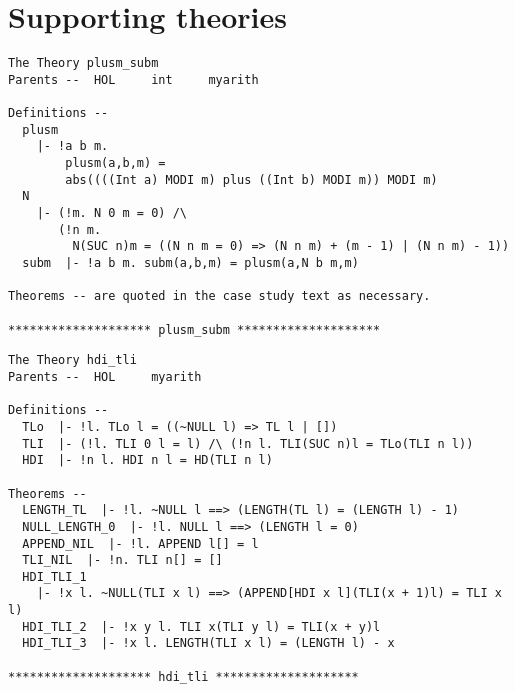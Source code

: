 \appendix
\newpage %

\section{Supporting theories}

\begin{verbatim}
The Theory plusm_subm
Parents --  HOL     int     myarith     

Definitions --
  plusm
    |- !a b m.
        plusm(a,b,m) =
        abs((((Int a) MODI m) plus ((Int b) MODI m)) MODI m)
  N
    |- (!m. N 0 m = 0) /\
       (!n m.
         N(SUC n)m = ((N n m = 0) => (N n m) + (m - 1) | (N n m) - 1))
  subm  |- !a b m. subm(a,b,m) = plusm(a,N b m,m)

Theorems -- are quoted in the case study text as necessary.

******************** plusm_subm ********************
\end{verbatim}

\begin{verbatim}
The Theory hdi_tli
Parents --  HOL     myarith     

Definitions --
  TLo  |- !l. TLo l = ((~NULL l) => TL l | [])
  TLI  |- (!l. TLI 0 l = l) /\ (!n l. TLI(SUC n)l = TLo(TLI n l))
  HDI  |- !n l. HDI n l = HD(TLI n l)
  
Theorems --
  LENGTH_TL  |- !l. ~NULL l ==> (LENGTH(TL l) = (LENGTH l) - 1)
  NULL_LENGTH_0  |- !l. NULL l ==> (LENGTH l = 0)
  APPEND_NIL  |- !l. APPEND l[] = l
  TLI_NIL  |- !n. TLI n[] = []
  HDI_TLI_1
    |- !x l. ~NULL(TLI x l) ==> (APPEND[HDI x l](TLI(x + 1)l) = TLI x l)
  HDI_TLI_2  |- !x y l. TLI x(TLI y l) = TLI(x + y)l
  HDI_TLI_3  |- !x l. LENGTH(TLI x l) = (LENGTH l) - x
  
******************** hdi_tli ********************
\end{verbatim}
